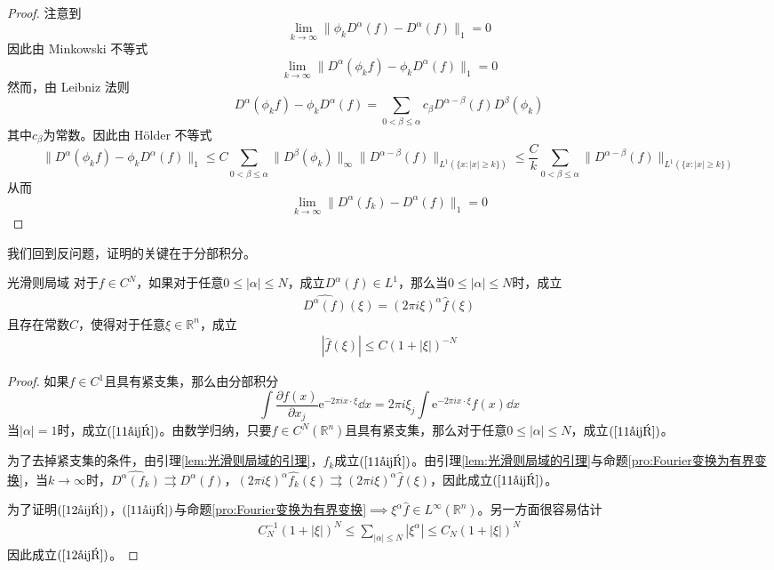 \documentclass[lang = cn, %
scheme = chinese          %
]
{elegantbook}             %
\newcommand{\R}{\mathbb{R}}            %
\newcommand{\ee}[1]{\mathrm{e}^{#1}}           %
\begin{document}
\begin{proof}
	注意到
	\[
	\lim_{k\to\infty}\|\phi_kD^\alpha(f)-D^\alpha(f)\|_1=0
	\]
	因此由 Minkowski 不等式
	\[
	\lim_{k\to\infty}\|D^\alpha(\phi_kf)-\phi_kD^\alpha(f)\|_1=0
	\]
	然而，由 Leibniz 法则
	\[
	D^\alpha(\phi_kf)-\phi_kD^\alpha(f)
	=\sum_{0<\beta\le \alpha}c_{\beta}D^{\alpha-\beta}(f)D^\beta(\phi_k)
	\]
	其中$c_\beta$为常数。因此由 Hölder 不等式
	\[
	\|D^\alpha(\phi_kf)-\phi_kD^\alpha(f)\|_1
	\le C\sum_{0<\beta\le \alpha}\|D^\beta(\phi_k)\|_{\infty}\|D^{\alpha-\beta}(f)\|_{L^1(\{ x:|x|\ge k \})}
	\le \frac{C}{k}\sum_{0<\beta\le \alpha}\|D^{\alpha-\beta}(f)\|_{L^1(\{ x:|x|\ge k \})}
	\]
	从而
	\[
	\lim_{k\to\infty}\|D^\alpha(f_k)-D^\alpha(f)\|_1=0
	\]
\end{proof}

我们回到反问题，证明的关键在于分部积分。

\begin{proposition}{}{光滑则局域}
	对于$f\in C^N$，如果对于任意$0\le |\alpha| \le N$，成立$D^\alpha(f)\in L^1$，那么当$0\le |\alpha| \le N$时，成立
	\begin{gather}
		\label{11式}
		\widehat{D^\alpha(f)}(\xi)
		=(2\pi i \xi)^{\alpha}\widehat{f}(\xi)
	\end{gather}
	且存在常数$C$，使得对于任意$\xi\in\R^n$，成立
	\begin{gather}
		\label{12式}
		|\widehat{f}(\xi)|
		\le C(1+|\xi|)^{-N}
	\end{gather}
\end{proposition}

\begin{proof}
	如果$f\in C^1$且具有紧支集，那么由分部积分
	\[
	\int \frac{\partial f(x)}{\partial x_j}\ee{-2\pi i x\cdot \xi}\dd x
	=2\pi i \xi_j \int \ee{-2\pi i x\cdot \xi}f(x)\dd x
	\]
	当$|\alpha|=1$时，成立$(\ref{11式})$。由数学归纳，只要$f\in C^N(\R^n)$且具有紧支集，那么对于任意$0\le |\alpha| \le N$，成立$(\ref{11式})$。
	
	为了去掉紧支集的条件，由引理\ref{lem:光滑则局域的引理}，$f_k$成立$(\ref{11式})$。由引理\ref{lem:光滑则局域的引理}与命题\ref{pro:Fourier变换为有界变换}，当$k\to\infty$时，$\widehat{D^\alpha(f_k)}\rightrightarrows D^\alpha(f)$，$(2\pi i \xi)^{\alpha}\widehat{f_k}(\xi)\rightrightarrows (2\pi i \xi)^{\alpha}\widehat{f}(\xi)$，因此成立$(\ref{11式})$。
	
	为了证明$(\ref{12式})$，$(\ref{11式})$与命题\ref{pro:Fourier变换为有界变换}$\implies \xi^\alpha\widehat{f}\in L^\infty(\R^n)$。另一方面很容易估计
	\begin{gather}
		\label{14式}
		C_N^{-1}(1+|\xi|)^N
		\le \sum_{|\alpha|\le N}|\xi^\alpha|
		\le C_N(1+|\xi|)^N
	\end{gather}
	因此成立$(\ref{12式})$。
\end{proof}
\end{document}
